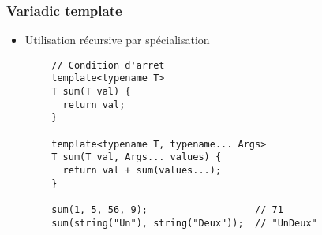 \documentclass[C++.tex]{subfiles}
\begin{document}
\begin{frame}[fragile]
	\frametitle{Variadic template}
	\begin{itemize}
		\item Utilisation récursive par spécialisation
	\end{itemize}

	\begin{verbatim}
		// Condition d'arret
		template<typename T>
		T sum(T val) {
		  return val;
		}

		template<typename T, typename... Args>
		T sum(T val, Args... values) {
		  return val + sum(values...);
		}

		sum(1, 5, 56, 9);                   // 71
		sum(string("Un"), string("Deux"));  // "UnDeux"
	\end{verbatim}


\end{frame}
\end{document}
